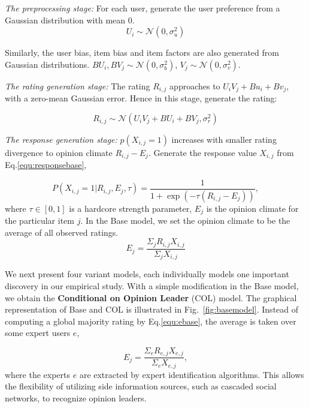 \documentclass[sigconf]{acmart}
\begin{document}
\textit{The preprocessing stage:} For each user, generate the user preference from a Gaussian distribution with mean $0$.
\begin{equation}\label{equ:preferencebase}
U_i \sim \mathcal{N}(0,\sigma_u^2)
\end{equation}

Similarly, the user bias, item bias and item factors are also generated from Gaussian distributions. $BU_i, BV_j \sim \mathcal{N}(0,\sigma_b^2)$,  $V_j \sim \mathcal{N}(0,\sigma_v^2)$.

\textit{The rating generation stage:} The rating $R_{i,j}$ approaches to $U_iV_j+Bu_i + Bv_j $, with a  zero-mean Gaussian error. Hence in this stage, generate the rating: 

\begin{equation}\label{equ:rating}
R_{i,j} \sim \mathcal{N}(U_iV_j+BU_i+BV_j, \sigma_r^2)
\end{equation}

\textit{The response generation stage:} $p(X_{i,j}=1)$ increases with smaller rating divergence to opinion climate $R_{i,j}-E_j$. Generate the response value $X_{i,j}$ from Eq.\ref{equ:responsebase},

\begin{equation}\label{equ:responsebase}
 P(X_{i,j}=1|R_{i,j},E_j,\tau)=\frac{1}{1+\exp{(-\tau(R_{i,j}-E_j))}},
\end{equation}
where $\tau\in [0,1]$ is a hardcore strength parameter, $E_j$ is the opinion climate for the particular item $j$. In the Base model, we set the opinion climate to be the average of all observed ratings.
\begin{equation}\label{equ:ebase}
 E_j=\frac{\Sigma_jR_{i,j}X_{i,j}}{\Sigma_j X_{i,j}}
\end{equation}


We next present four variant models, each individually models one important discovery in our empirical study. With a simple modification in the Base model, we obtain the \textbf{Conditional on Opinion Leader} (COL) model. The graphical representation of Base and COL is illustrated in Fig.~\ref{fig:basemodel}. Instead of computing a global majority rating by Eq.\ref{equ:ebase}, the average is taken over some expert users $e$,

\begin{equation}\label{eexpert}
E_j = \frac{\Sigma_e R_{e,j}X_{e,j}}{\Sigma_e X_{e,j}},
\end{equation}
where the experts $e$ are extracted by expert identification algorithms. This allows the flexibility of utilizing side information sources, such as cascaded social networks, to recognize opinion leaders. 
\end{document}

